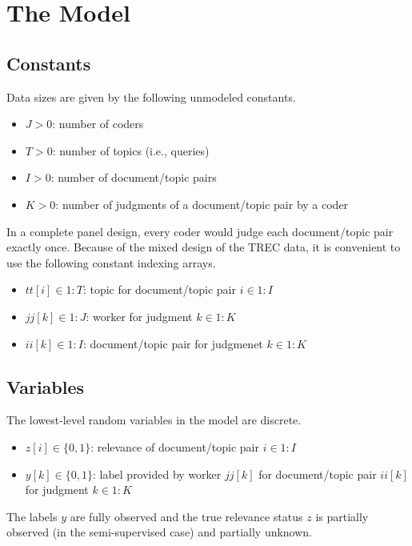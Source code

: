 \documentclass{article}
\begin{document}
\section{The Model}

\subsection{Constants}

Data sizes are given by the following unmodeled constants.
%
\begin{itemize}
\item $J > 0$: number of coders
\item $T > 0$: number of topics (i.e., queries)
\item $I > 0$: number of document/topic pairs
\item $K > 0$: number of judgments of a document/topic pair by a coder
\end{itemize}
%
In a complete panel design, every coder would judge each
document/topic pair exactly once.  Because of the mixed design of
the TREC data, it is convenient to use the following constant indexing arrays.
%
\begin{itemize}
\item $tt[i] \in 1{:}T$: topic for document/topic pair $i \in 1{:}I$
\item $jj[k] \in 1{:}J$: worker for judgment $k \in 1{:}K$
\item $ii[k] \in 1{:}I$: document/topic pair for judgmenet $k \in 1{:}K$
\end{itemize}

\subsection{Variables}

The lowest-level random variables in the model are discrete.
%
\begin{itemize}
\item $z[i] \in \{0, 1\}$: relevance of document/topic pair $i \in 1{:}I$
\item $y[k] \in \{0, 1\}$: label provided by worker $jj[k]$ for
document/topic pair $ii[k]$ for judgment $k \in 1{:}K$
\end{itemize}
%
The labels $y$ are fully observed and the true relevance status $z$
is partially observed (in the semi-supervised case) and partially unknown.
\end{document}

